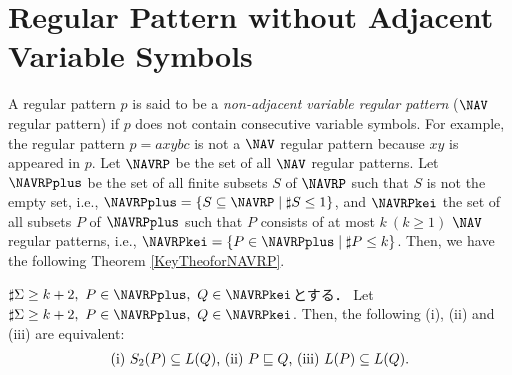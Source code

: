 \section{Regular Pattern without Adjacent Variable Symbols}

A regular pattern $p$ is said to be a {\it non-adjacent variable regular pattern} ($\NAV$ regular pattern)  
if $p$ does not contain consecutive variable symbols.
For example, the regular pattern $p=axybc$ is not a $\NAV$ regular pattern because $xy$ is appeared in $p$.
Let $\NAVRP$ be the set of all $\NAV$ regular patterns.
Let $\NAVRPplus$ be the set of all finite subsets $S$ of $\NAVRP$ such that $S$ is not the empty set, i.e., $\NAVRPplus=\{S \subseteq \NAVRP \mid \sharp S \leq 1\}$,
and $\NAVRPkei$ the set of all subsets $P$ of $\NAVRPplus$ such that $P$ consists of at most $k~(k\geq 1)$ $\NAV$ regular patterns, i.e., $\NAVRPkei=\{P\in \NAVRPplus \mid \sharp P \leq k\}$.
Then, we have the following Theorem \ref{KeyTheoforNAVRP}.

\begin{thm}\label{KeyTheoforNAVRP}%
  $\sharp \Sigma \ge k+2,~P\in \NAVRPplus,~Q \in \NAVRPkei$とする．
Let $\sharp \Sigma \ge k+2,~P\in \NAVRPplus,~Q \in \NAVRPkei$.  
Then, the following (i), (ii) and (iii) are equivalent:
\[
\begin{tabular}{ll}
(i) $S_{2}(P) \subseteq L(Q)$,
(ii) $P \sqsubseteq Q$,
(iii) $L(P) \subseteq L(Q)$.
\end{tabular}
\]
\end{thm}

